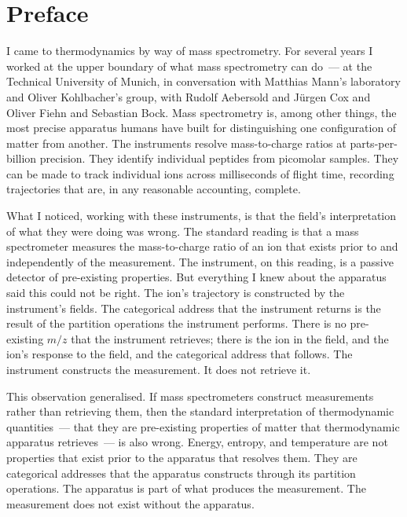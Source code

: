 
\chapter*{Preface}

\noindent
I came to thermodynamics by way of mass spectrometry. For several years I worked at
the upper boundary of what mass spectrometry can do~--- at the Technical University
of Munich, in conversation with Matthias Mann's laboratory and Oliver Kohlbacher's
group, with Rudolf Aebersold and J\"urgen Cox and Oliver Fiehn and Sebastian Bock.
Mass spectrometry is, among other things, the most precise apparatus humans have
built for distinguishing one configuration of matter from another. The instruments
resolve mass-to-charge ratios at parts-per-billion precision. They identify individual
peptides from picomolar samples. They can be made to track individual ions across
milliseconds of flight time, recording trajectories that are, in any reasonable
accounting, complete.

What I noticed, working with these instruments, is that the field's interpretation
of what they were doing was wrong. The standard reading is that a mass spectrometer
measures the mass-to-charge ratio of an ion that exists prior to and independently of
the measurement. The instrument, on this reading, is a passive detector of
pre-existing properties. But everything I knew about the apparatus said this could
not be right. The ion's trajectory is constructed by the instrument's fields.
The categorical address that the instrument returns is the result of the partition
operations the instrument performs. There is no pre-existing $m/z$ that the instrument
retrieves; there is the ion in the field, and the ion's response to the field, and the
categorical address that follows. The instrument constructs the measurement.
It does not retrieve it.

This observation generalised. If mass spectrometers construct measurements rather than
retrieving them, then the standard interpretation of thermodynamic quantities~--- that
they are pre-existing properties of matter that thermodynamic apparatus retrieves~---
is also wrong. Energy, entropy, and temperature are not properties that exist prior to
the apparatus that resolves them. They are categorical addresses that the apparatus
constructs through its partition operations. The apparatus is part of what produces
the measurement. The measurement does not exist without the apparatus.

